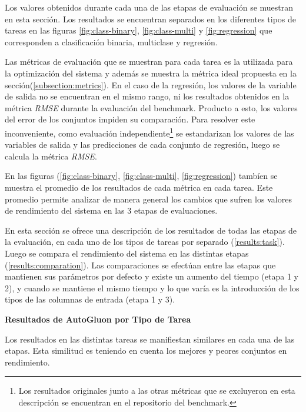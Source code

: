 Los valores obtenidos durante cada una de las etapas de evaluación se muestran en esta sección. Los resultados se encuentran separados en los diferentes tipos de tareas
en las figuras \ref{fig:class-binary}, \ref{fig:class-multi} y \ref{fig:regression} que corresponden a clasificación binaria, multiclase y regresión.  

Las métricas de evaluación que se muestran para cada tarea es la utilizada para la optimización del sistema y además se muestra la métrica ideal propuesta en la 
sección(\ref{subsection:metrics}).
En el caso de la regresión, los valores de la variable de salida no se encuentran en el mismo rango, ni los resultados obtenidos en la métrica \textit{RMSE} 
durante la evaluación del benchmark. Producto a esto, los valores del error de los conjuntos impiden su comparación. Para resolver este inconveniente,
como evaluación independiente\footnote{Los resultados originales junto a las otras métricas que se excluyeron en esta descripción se encuentran en el repositorio del 
benchmark.} se estandarizan los valores de las variables de salida y las predicciones de cada conjunto de regresión, luego se calcula la métrica 
\textit{RMSE}.

En las figuras (\ref{fig:class-binary}, \ref{fig:class-multi}, \ref{fig:regression}) tambíen se muestra el promedio de los resultados de cada métrica en cada tarea. 
Este promedio permite analizar de manera general los cambios que sufren los valores de rendimiento del sistema en las 3 etapas de evaluaciones.

En esta sección se ofrece una descripción de los resultados de todas las etapas de la evaluación, en cada uno de los tipos de tareas por 
separado (\ref{results:task}). 
Luego se compara el rendimiento del sistema en las distintas etapas (\ref{results:comparation}). Las comparaciones se efectúan entre las etapas que 
mantienen sus parámetros por defecto y existe un aumento del tiempo (etapa 1 y 2), y cuando se mantiene el mismo tiempo y lo que varía es la introducción de los 
tipos de las columnas de entrada (etapa 1 y 3).


\begin{flushleft} 
  {\large { \textbf{Resultados de AutoGluon por Tipo de Tarea}}}\label{results:task}
\end{flushleft}

Los resultados en las distintas tareas se manifiestan similares en cada una de las etapas. Esta similitud es teniendo en cuenta los mejores y peores conjuntos en 
rendimiento.


